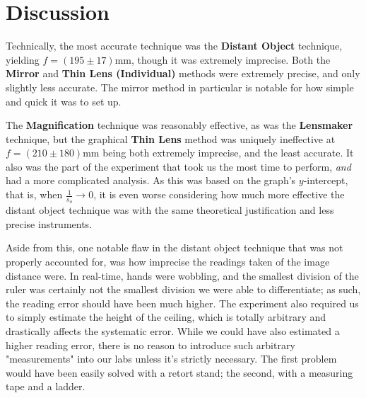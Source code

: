 \chapter{Discussion}


Technically, the most accurate technique was the \textbf{Distant Object} technique, yielding $f = (195 \pm 17) \unit{\milli\metre}$, though it was extremely imprecise. Both the \textbf{Mirror} and \textbf{Thin Lens (Individual)} methods were extremely precise, and only slightly less accurate. The mirror method in particular is notable for how simple and quick it was to set up.

The \textbf{Magnification} technique was reasonably effective, as was the \textbf{Lensmaker} technique, but the graphical \textbf{Thin Lens} method was uniquely ineffective at $f = (210 \pm 180) \unit{\milli\metre}$ being both extremely imprecise, and the least accurate. It also was the part of the experiment that took us the most time to perform, \textit{and} had a more complicated analysis. As this was based on the graph's $y$-intercept, that is, when $\frac{1}{s_o} \to 0$, it is even worse considering how much more effective the distant object technique was with the same theoretical justification and less precise instruments.

Aside from this, one notable flaw in the distant object technique that was not properly accounted for, was how imprecise the readings taken of the image distance were. In real-time, hands were wobbling, and the smallest division of the ruler was certainly not the smallest division we were able to differentiate; as such, the reading error should have been much higher. The experiment also required us to simply estimate the height of the ceiling, which is totally arbitrary and drastically affects the systematic error. While we could have also estimated a higher reading error, there is no reason to introduce such arbitrary "measurements" into our labs unless it's strictly necessary. The first problem would have been easily solved with a retort stand; the second, with a measuring tape and a ladder.
